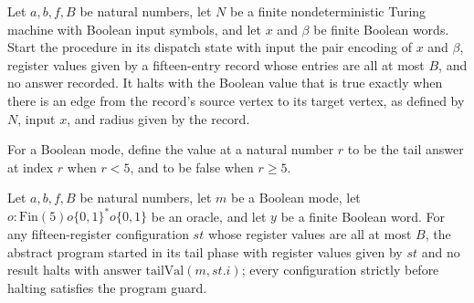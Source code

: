 \begin{theorem}
\label{Complexity.PathHard.dispatch_halt}
\leanok
{}
Let $a,b,f,B$ be natural numbers, let $N$ be a finite nondeterministic Turing machine
with Boolean input symbols, and let $x$ and $\beta$ be finite Boolean words. Start the
procedure in its dispatch state with input the pair encoding of $x$ and $\beta$,
register values given by a fifteen-entry record whose entries are all at most $B$, and
no answer recorded. It halts with the Boolean value that is true exactly when there is
an edge from the record's source vertex to its target vertex, as defined by $N$, input
$x$, and radius given by the record.
\end{theorem}

\begin{definition}
\label{Complexity.PathHard.tailVal}
\leanok
{}
For a Boolean mode, define the value at a natural number $r$ to be the tail answer at
index $r$ when $r<5$, and to be false when $r\ge 5$.
\end{definition}

\begin{theorem}
\label{Complexity.PathHard.tail_halt}
\leanok
{}
Let $a,b,f,B$ be natural numbers, let $m$ be a Boolean mode, let
$o:\mathrm{Fin}(5)	o\{0,1\}^*	o\{0,1\}$ be an oracle, and let $y$ be a finite
Boolean word. For any fifteen-register configuration $st$ whose register values are all
at most $B$, the abstract program started in its tail phase with register values given by
$st$ and no result halts with answer $\mathrm{tailVal}(m,st.i)$; every configuration
strictly before halting satisfies the program guard.
\end{theorem}

